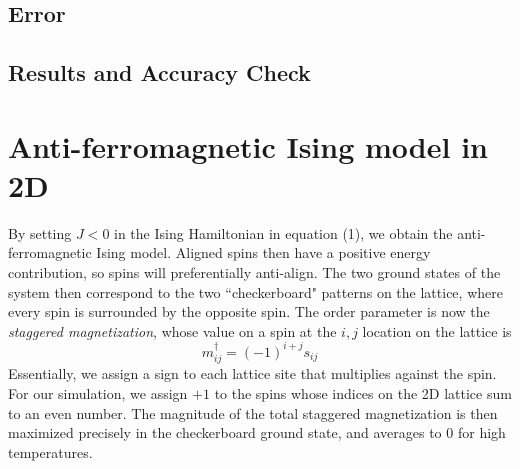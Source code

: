 \documentclass[twocolumn,aps,prl]{revtex4-1} %
\begin{document}
\subsection{Error}


\subsection{Results and Accuracy Check}





\section{Anti-ferromagnetic Ising model in 2D}
By setting $J < 0$ in the Ising Hamiltonian in equation (1), we obtain the anti-ferromagnetic Ising model. Aligned spins then have a positive energy contribution, so spins will preferentially anti-align. The two ground states of the system then correspond to the two ``checkerboard" patterns on the lattice, where every spin is surrounded by the opposite spin. The order parameter is now the \textit{staggered magnetization}, whose value on a spin at the $i,j$ location on the lattice is
\begin{equation}
	m^{\dagger}_{ij} = (-1)^{i+j}s_{ij}
\end{equation}
Essentially, we assign a sign to each lattice site that multiplies against the spin. For our simulation, we assign $+1$ to the spins whose indices on the 2D lattice sum to an even number. The magnitude of the total staggered magnetization is then maximized precisely in the checkerboard ground state, and averages to 0 for high temperatures.
\end{document}
